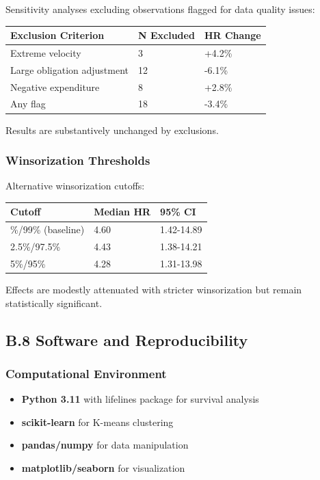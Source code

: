 \documentclass[
  12pt,
  letterpaper,
]{article}
\providecommand{\tightlist}{%
  \setlength{\itemsep}{0pt}\setlength{\parskip}{0pt}}
\begin{document}
Sensitivity analyses excluding observations flagged for data quality
issues:

\begin{longtable}[]{@{}lll@{}}
\toprule\noalign{}
Exclusion Criterion & N Excluded & HR Change \\
\midrule\noalign{}
\endhead
\bottomrule\noalign{}
\endlastfoot
Extreme velocity & 3 & +4.2\% \\
Large obligation adjustment & 12 & -6.1\% \\
Negative expenditure & 8 & +2.8\% \\
Any flag & 18 & -3.4\% \\
\end{longtable}

Results are substantively unchanged by exclusions.

\subsubsection{Winsorization Thresholds}\label{winsorization-thresholds}

Alternative winsorization cutoffs:

\begin{longtable}[]{@{}lll@{}}
\toprule\noalign{}
Cutoff & Median HR & 95\% CI \\
\midrule\noalign{}
\endhead
\bottomrule\noalign{}
\endlastfoot
1\%/99\% (baseline) & 4.60 & 1.42-14.89 \\
2.5\%/97.5\% & 4.43 & 1.38-14.21 \\
5\%/95\% & 4.28 & 1.31-13.98 \\
\end{longtable}

Effects are modestly attenuated with stricter winsorization but remain
statistically significant.

\subsection{B.8 Software and
Reproducibility}\label{b.8-software-and-reproducibility}

\subsubsection{Computational
Environment}\label{computational-environment}

\begin{itemize}
\tightlist
\item
  \textbf{Python 3.11} with lifelines package for survival analysis
\item
  \textbf{scikit-learn} for K-means clustering
\item
  \textbf{pandas/numpy} for data manipulation
\item
  \textbf{matplotlib/seaborn} for visualization
\end{itemize}
\end{document}
